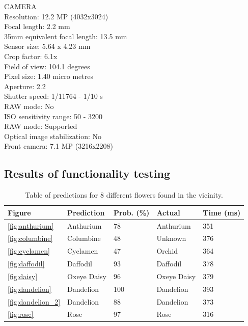 \documentclass[12pt,a4paper]{report}
\begin{document}
\par

CAMERA \\
Resolution: 12.2 MP (4032x3024) \\
Focal length: 2.2 mm \\
35mm equivalent focal length: 13.5 mm \\
Sensor size: 5.64 x 4.23 mm \\ 
Crop factor: 6.1x \\
Field of view: 104.1 degrees \\
Pixel size: 1.40 micro metres \\
Aperture: 2.2 \\
Shutter speed: 1/11764 - 1/10 s \\
RAW mode: No \\
ISO sensitivity range: 50 - 3200 \\
RAW mode: Supported \\
Optical image stabilization: No \\
Front camera: 7.1 MP (3216x2208)

\subsection{Results of functionality testing}
\label{subsec:functionality}

\begin{table}[h!]
    \begin{tabular}{ |l|l|l|l|l| }
        \hline
        Figure & Prediction & Prob. (\%) & Actual & Time (ms) \\
        \hline
        \ref{fig:anthurium} & Anthurium & 78 & Anthurium & 351 \\
        \hline
        \ref{fig:columbine} & Columbine & 48 & Unknown & 376 \\
        \hline
        \ref{fig:cyclamen} & Cyclamen & 47 & Orchid & 364 \\
        \hline
        \ref{fig:daffodil} & Daffodil & 93 & Daffodil & 378 \\
        \hline
        \ref{fig:daisy} & Oxeye Daisy & 96 & Oxeye Daisy & 379 \\
        \hline
        \ref{fig:dandelion} & Dandelion & 100 & Dandelion & 393 \\
        \hline
        \ref{fig:dandelion_2} & Dandelion & 88 & Dandelion & 373 \\
        \hline
        \ref{fig:rose} & Rose & 97 & Rose & 316 \\
        \hline
    \end{tabular}
    \caption{Table of predictions for 8 different flowers found in the vicinity.}
    \label{table:results}
\end{table}
\end{document}
